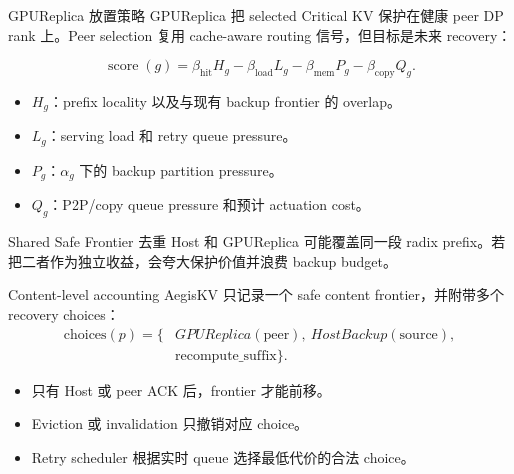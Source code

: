 \documentclass[aspectratio=43]{beamer}
\newcommand{\tightitems}{\setlength{\itemsep}{2pt}\setlength{\parskip}{0pt}}
\newcommand{\AegisKV}{AegisKV}
\newcommand{\Critical}{Critical}
\newcommand{\HostBackup}{HostBackup}
\newcommand{\GPUReplica}{GPUReplica}
\begin{document}
\begin{frame}{GPUReplica 放置策略}
  \small
  \GPUReplica{} 把 selected \Critical{} KV 保护在健康 peer DP rank 上。Peer selection 复用 cache-aware routing 信号，但目标是未来 recovery：

  \vspace{0.10cm}
  \[
    \operatorname{score}(g)
    =
    \beta_{\mathrm{hit}}H_g
    -
    \beta_{\mathrm{load}}L_g
    -
    \beta_{\mathrm{mem}}P_g
    -
    \beta_{\mathrm{copy}}Q_g .
  \]

  \begin{itemize}
    \tightitems
    \item $H_g$：prefix locality 以及与现有 backup frontier 的 overlap。
    \item $L_g$：serving load 和 retry queue pressure。
    \item $P_g$：$\alpha_g$ 下的 backup partition pressure。
    \item $Q_g$：P2P/copy queue pressure 和预计 actuation cost。
  \end{itemize}
\end{frame}

\begin{frame}{Shared Safe Frontier 去重}
  \small
  Host 和 GPUReplica 可能覆盖同一段 radix prefix。若把二者作为独立收益，会夸大保护价值并浪费 backup budget。

  \vspace{0.10cm}
  \begin{block}{Content-level accounting}
    \AegisKV{} 只记录一个 safe content frontier，并附带多个 recovery choices：
    \[
      \begin{aligned}
      \mathrm{choices}(p)=\{&
        \GPUReplica(\mathrm{peer}),\ \HostBackup(\mathrm{source}),\\
        &\mathrm{recompute\_suffix}\}.
      \end{aligned}
    \]
  \end{block}

  \vspace{0.10cm}
  \begin{itemize}
    \tightitems
    \item 只有 Host 或 peer ACK 后，frontier 才能前移。
    \item Eviction 或 invalidation 只撤销对应 choice。
    \item Retry scheduler 根据实时 queue 选择最低代价的合法 choice。
  \end{itemize}
\end{frame}
\end{document}
